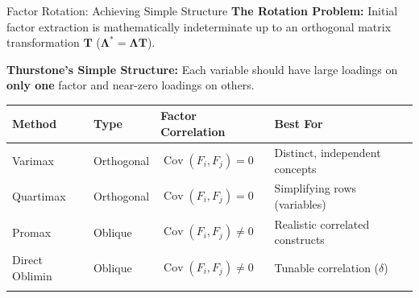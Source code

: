 \documentclass[aspectratio=169,ignorenonframetext]{beamer}
\begin{document}
\begin{frame}{Factor Rotation: Achieving Simple Structure}
\textbf{The Rotation Problem:} Initial factor extraction is
mathematically indeterminate up to an orthogonal matrix transformation
\(\mathbf{T}\)
(\(\mathbf{\Lambda}^{\ast} = \mathbf{\Lambda}\mathbf{T}\)).

\textbf{Thurstone's Simple Structure:} Each variable should have large
loadings on \textbf{only one} factor and near-zero loadings on others.

{\def\LTcaptype{none} %
\begin{longtable}[]{@{}
  >{\raggedright\arraybackslash}p{}
  >{\raggedright\arraybackslash}p{}
  >{\raggedright\arraybackslash}p{}
  >{\raggedright\arraybackslash}p{}@{}}
\toprule\noalign{}
\begin{minipage}[b]{\linewidth}\raggedright
\textbf{Method}
\end{minipage} & \begin{minipage}[b]{\linewidth}\raggedright
\textbf{Type}
\end{minipage} & \begin{minipage}[b]{\linewidth}\raggedright
\textbf{Factor Correlation}
\end{minipage} & \begin{minipage}[b]{\linewidth}\raggedright
\textbf{Best For}
\end{minipage} \\
\midrule\noalign{}
\endhead
Varimax & Orthogonal & \(\operatorname{Cov}(F_{i},F_{j}) = 0\) &
Distinct, independent concepts \\
Quartimax & Orthogonal & \(\operatorname{Cov}(F_{i},F_{j}) = 0\) &
Simplifying rows (variables) \\
Promax & Oblique & \(\operatorname{Cov}(F_{i},F_{j}) \neq 0\) &
Realistic correlated constructs \\
Direct Oblimin & Oblique & \(\operatorname{Cov}(F_{i},F_{j}) \neq 0\) &
Tunable correlation (\(\delta\)) \\
\bottomrule\noalign{}
\end{longtable}
}
\end{frame}
\end{document}
